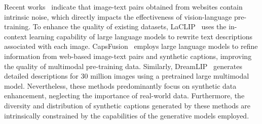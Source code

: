Recent works~\cite{ALIP, yu2024capsfusion, sharegpt4v} indicate that image-text pairs obtained from websites contain intrinsic noise, which directly impacts the effectiveness of vision-language pre-training. To enhance the quality of existing datasets, LaCLIP~\cite{laclip} uses the in-context learning capability of large language models to rewrite text descriptions associated with each image. CapsFusion~\cite{yu2024capsfusion} employs large language models to refine information from web-based image-text pairs and synthetic captions, improving the quality of multimodal pre-training data. 
Similarly, DreamLIP~\cite{DreamLIP} generates detailed descriptions for 30 million images using a pretrained large multimodal model. Nevertheless, these methods predominantly focus on synthetic data enhancement, neglecting the importance of real-world data. Furthermore, the diversity and distribution of synthetic captions generated by these methods are intrinsically constrained by the capabilities of the generative models employed.